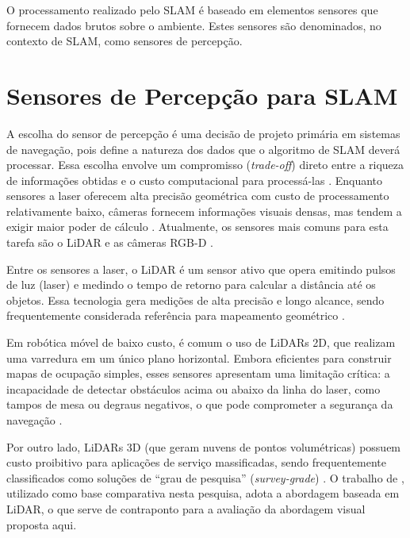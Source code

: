 O processamento realizado pelo SLAM é baseado em elementos sensores que fornecem dados brutos sobre o ambiente. Estes sensores são denominados, no contexto de SLAM, como sensores de percepção.

\section{Sensores de Percepção para SLAM}

A escolha do sensor de percepção é uma decisão de projeto primária em sistemas de navegação, pois define a natureza dos dados que o algoritmo de SLAM deverá processar. Essa escolha envolve um compromisso (\textit{trade-off}) direto entre a riqueza de informações obtidas e o custo computacional para processá-las \cite{taheri2021slamdefinitionevolution}. Enquanto sensores a laser oferecem alta precisão geométrica com custo de processamento relativamente baixo, câmeras fornecem informações visuais densas, mas tendem a exigir maior poder de cálculo \cite{gatesichapakorn2019rosbasedautonomous}. Atualmente, os sensores mais comuns para esta tarefa são o LiDAR e as câmeras RGB-D \cite{jin2019visualslamrgbd, taheri2021slamdefinitionevolution}.

Entre os sensores a laser, o LiDAR é um sensor ativo que opera emitindo pulsos de luz (laser) e medindo o tempo de retorno para calcular a distância até os objetos. Essa tecnologia gera medições de alta precisão e longo alcance, sendo frequentemente considerada referência para mapeamento geométrico \cite{balado2025systematicliteraturereview}.

Em robótica móvel de baixo custo, é comum o uso de LiDARs 2D, que realizam uma varredura em um único plano horizontal. Embora eficientes para construir mapas de ocupação simples, esses sensores apresentam uma limitação crítica: a incapacidade de detectar obstáculos acima ou abaixo da linha do laser, como tampos de mesa ou degraus negativos, o que pode comprometer a segurança da navegação \cite{gatesichapakorn2019rosbasedautonomous}.

Por outro lado, LiDARs 3D (que geram nuvens de pontos volumétricas) possuem custo proibitivo para aplicações de serviço massificadas, sendo frequentemente classificados como soluções de ``grau de pesquisa'' (\textit{survey-grade}) \cite{balado2025systematicliteraturereview}. O trabalho de , utilizado como base comparativa nesta pesquisa, adota a abordagem baseada em LiDAR, o que serve de contraponto para a avaliação da abordagem visual proposta aqui.


